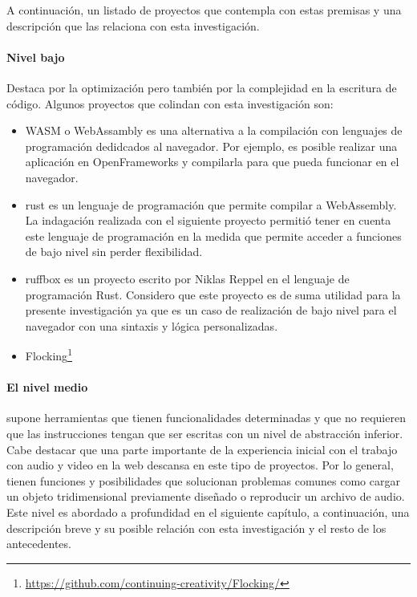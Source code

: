 A continuación, un listado de proyectos que contempla con estas premisas y una descripción que las relaciona con esta investigación. 

\paragraph{Nivel bajo}

Destaca por la optimización pero también por la complejidad en la escritura de código. Algunos proyectos que colindan con esta investigación son: 


\begin{itemize}

\item \Gls{WASM} o WebAssambly es una alternativa a la compilación con lenguajes de programación dedidcados al navegador. Por ejemplo, es posible realizar una aplicación en OpenFrameworks y compilarla para que pueda funcionar en el navegador.  
\item \Gls{rust} es un lenguaje de programación que permite compilar a WebAssembly. La indagación realizada con el siguiente proyecto permitió tener en cuenta este lenguaje de programación en la medida que permite acceder a funciones de bajo nivel sin perder flexibilidad.  
\item \Gls{ruffbox} es un proyecto escrito por Niklas Reppel en el lenguaje de programación Rust. Considero que este proyecto es de suma utilidad para la presente investigación ya que es un caso de realización de bajo nivel para el navegador con una sintaxis y lógica personalizadas. 
\item Flocking\footnote{\url{https://github.com/continuing-creativity/Flocking/}}
\end{itemize}


\paragraph{El nivel medio} supone herramientas que tienen funcionalidades determinadas y que no requieren que las instrucciones tengan que ser escritas con un nivel de abstracción inferior. Cabe destacar que una parte importante de la experiencia inicial con el trabajo con audio y video en la web descansa en este tipo de proyectos. Por lo general, tienen funciones y posibilidades que solucionan problemas comunes como cargar un objeto tridimensional previamente diseñado o reproducir un archivo de audio. Este nivel es abordado a profundidad en el siguiente capítulo, a continuación, una descripción breve y su posible relación con esta investigación y el resto de los antecedentes. 

